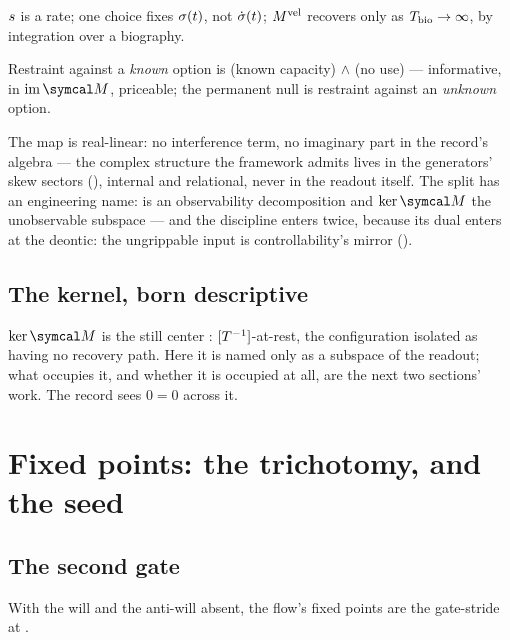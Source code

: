 \documentclass[../main]{subfiles}
\begin{document}
\begin{lemma}
  $s$ is a rate; one choice fixes $\sigma(t)$, not $\dot{\sigma}(t)$; $M\sp{\mathrm{vel}}$ recovers
  only as $T\sb{\mathrm{bio}}\to\infty$, by integration over a biography.
\end{lemma}

\begin{lemma}
  Restraint against a \emph{known} option is (known capacity) $\wedge$ (no use) ---
  informative, in $\mathrm{im}\,\readout$, priceable; the permanent null is restraint against
  an \emph{unknown} option.
\end{lemma}

The map is real-linear: no interference term, no imaginary part in the record's algebra
--- the complex structure the framework admits lives in the generators' skew sectors
(), internal and relational, never in the readout itself. The split has
an engineering name:  is an observability decomposition and $\ker\readout$
the unobservable subspace \parencite{a:kalman} --- and the discipline enters twice,
because its dual enters at the deontic: the ungrippable input is controllability's
mirror ().

\subsection{The kernel, born descriptive}
\label{subsec:readout:kernel}
%
$\ker\readout$ is the still center : $[T\sp{-1}]$-at-rest, the configuration
 isolated as having no recovery path. Here it is named only as a subspace of
the readout; what occupies it, and whether it is occupied at all, are the next two sections'
work. The record sees $0=0$ across it.

\clearpage
\section{Fixed points: the trichotomy, and the seed}
\label{sec:fixed-points}

\subsection{The second gate}
\label{subsec:fixed:gate}
%
With the will and the anti-will absent, the flow's fixed points are the gate-stride
 at .
\end{document}
